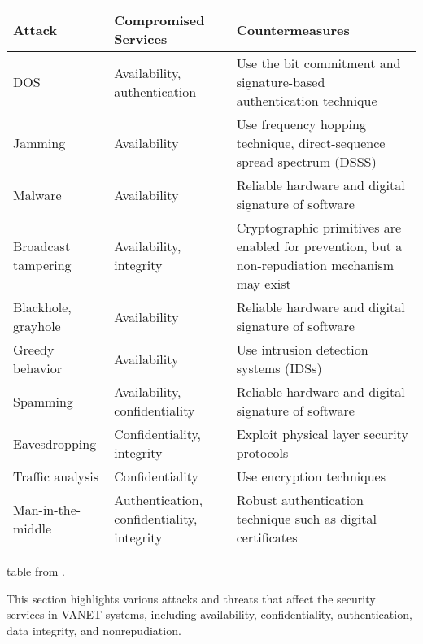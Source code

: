 \begin{table}[h]
    \centering
    \begin{tabular}{|l|l|l|}
        \hline
        \textbf{Attack} & \textbf{Compromised Services} & \textbf{Countermeasures} \\ \hline
        DOS & Availability, authentication & Use the bit commitment and signature-based authentication technique \\ \hline
        Jamming & Availability & Use frequency hopping technique, direct-sequence spread spectrum (DSSS) \\ \hline
        Malware & Availability & Reliable hardware and digital signature of software \\ \hline
        Broadcast tampering & Availability, integrity & Cryptographic primitives are enabled for prevention, but a non-repudiation mechanism may exist \\ \hline
        Blackhole, grayhole & Availability & Reliable hardware and digital signature of software \\ \hline
        Greedy behavior & Availability & Use intrusion detection systems (IDSs) \\ \hline
        Spamming & Availability, confidentiality & Reliable hardware and digital signature of software \\ \hline
        Eavesdropping & Confidentiality, integrity & Exploit physical layer security protocols \\ \hline
        Traffic analysis & Confidentiality & Use encryption techniques \\ \hline
        Man-in-the-middle & Authentication, confidentiality, integrity & Robust authentication technique such as digital certificates \\ \hline
    \end{tabular}
    \label{tab:Summary of Attacks and Countermeasures. }
\end{table}

table from \cite{sheikh2019comprehensive} .


This section highlights various attacks and threats that affect the security services in VANET systems, including availability, confidentiality, authentication, data integrity, and nonrepudiation.

